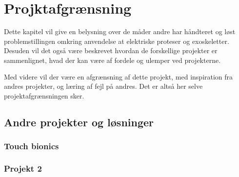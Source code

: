 \thispagestyle{fancy}
\chapter{Projktafgrænsning}
\label{chp:projektafgraensning}
Dette kapitel vil give en belysning over de måder andre har håndteret og løst problemstillingen omkring anvendelse at elektriske proteser og exoskeletter. Desuden vil det også være beskrevet hvordan de forskellige projekter er sammenlignet, hvad der kan være af fordele og ulemper ved projekterne.

Med videre vil der være en afgrænsning af dette projekt, med inspiration fra andres projekter, og læring af fejl på andres. Det er altså her selve projektafgrænsningen sker.
\section{Andre projekter og løsninger}
\subsection{Touch bionics}
\subsection{Projekt 2}